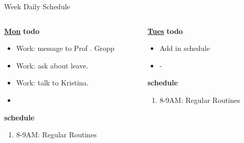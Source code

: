      \begin{block}{Week Daily Schedule}
        
        \begin{columns}
          \begin{column}{0.14\textwidth}{\small \underline{\bf Mon}}
            {\small \bf todo}\\ 
            \begin{itemize}
              \tiny \item \tiny Work: message to Prof . Gropp 
            \item \tiny Work: ask about leave. 
            \item \tiny Work: talk to Kristina. 
            \item \tiny 
            \end{itemize} 
                {\small  \bf schedule}\\
                \begin{enumerate} 
                  \tiny \item \tiny 8-9AM: Regular Routines 
                \end{enumerate}
          \end{column} 
          
          \begin{column}{0.14\textwidth}{\small \underline{\bf Tues}}
            {\small {\bf todo}}\\ 
            \begin{itemize}
              \tiny \item \tiny Add in schedule
            \item \tiny -
            \end{itemize} 
                {\small {\bf schedule}}
                \begin{enumerate} 
                  \tiny \item \tiny 8-9AM: Regular Routines 
                \end{enumerate} 
          \end{column}


\end{columns}
\end{block}
